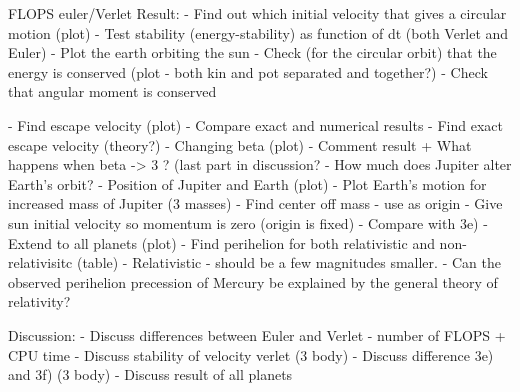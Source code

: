		
	FLOPS euler/Verlet
Result:		
	- Find out which initial velocity that gives a circular motion (plot)
	- Test stability (energy-stability) as function of dt (both Verlet and Euler)
	- Plot the earth orbiting the sun
	- Check (for the circular orbit) that the energy is conserved (plot - both kin and pot separated and together?)
	- Check that angular moment is conserved

	- Find escape velocity (plot)
	 	- Compare exact and numerical results
	- Find exact escape velocity (theory?)
	- Changing beta (plot)
		- Comment result + What happens when beta -> 3 ? (last part in discussion?
	- How much does Jupiter alter Earth's orbit?
	- Position of Jupiter and Earth (plot)	
	- Plot Earth's motion for increased mass of Jupiter (3 masses)
	- Find center off mass - use as origin
	- Give sun initial velocity so momentum is zero (origin is fixed)
	- Compare with 3e)
	- Extend to all planets (plot)
	- Find perihelion for both relativistic and non-relativisitc (table)
	- Relativistic - should be a few magnitudes smaller.	
	-  Can the observed perihelion
precession of Mercury be explained by the general theory of relativity?

Discussion:
	- Discuss differences between Euler and Verlet
		- number of FLOPS + CPU time
	- Discuss stability of velocity verlet (3 body)
	- Discuss difference 3e) and 3f) (3 body)
	- Discuss result of all planets


